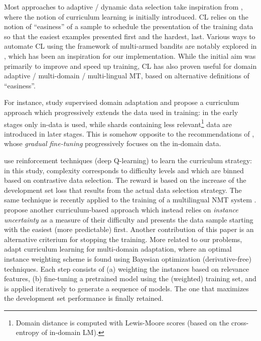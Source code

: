 \documentclass[11pt]{article}
\newcommand{\fyDone}[1]{\done[FY]\Todo[FY:]{\textcolor{orange}{#1}}}
\begin{document}
Most approaches to adaptive / dynamic data selection take inspiration from \citet{Bengio09curriculum}, where the notion of curriculum learning is initially introduced. CL relies on the notion of ``easiness'' of a sample to schedule the presentation of the training data so that the easiest examples presented first and the hardest, last. Various ways to automate CL using the framework of multi-armed bandits are notably explored in \citep{Graves17automated}, which has been an inspiration for our implementation. While the initial aim was primarily to improve and speed up training, CL has also proven useful for domain adaptive / multi-domain / multi-lingual MT, based on alternative definitions of ``easiness''.\fyDone{Ajouter Grave}

For instance, \citet{Zhang19curriculum} study supervised domain adaptation and propose a curriculum approach which progressively extends the data used in training: in the early stages only in-data is used, while shards containing less relevant\footnote{Domain distance is computed with Lewis-Moore scores (based on the cross-entropy of in-domain LM).} data are introduced in later stages. This is somehow opposite to the recommendations of \citet{Vanderwees17dynamic}, whose \emph{gradual fine-tuning} progressively focuses on the in-domain data.\fyDone{These have not been compared? and also to what we do ?} 

\citet{Kumar19reinforcement} use reinforcement techniques (deep Q-learning) to learn the curriculum strategy: in this study, complexity corresponds to difficulty levels and which are binned based on contrastive data selection. The reward is based on the increase of the development set loss that results from the actual data selection strategy.\fyDone{Alert: what do we do during warm-up ?} The same technique is recently applied to the training of a multilingual NMT system \citep{Kumar21learning}. \citet{Zhou20uncertainty} propose another curriculum-based approach which instead relies on \emph{instance uncertainty} as a measure of their difficulty and presents the data sample starting with the easiest (more predictable) first. Another contribution of this paper is an alternative criterium for stopping the training. More related to our problems, \citet{Wang20learning-multi} adapt curriculum learning for multi-domain adaptation, where an optimal instance weighting scheme is found using Bayesian optimization (derivative-free) techniques. Each step consists of (a) weighting the instances based on relevance features, (b) fine-tuning a pretrained model using the (weighted) training set, and is applied iteratively to generate a sequence of models. The one that maximizes the development set performance is finally retained.
\end{document}
